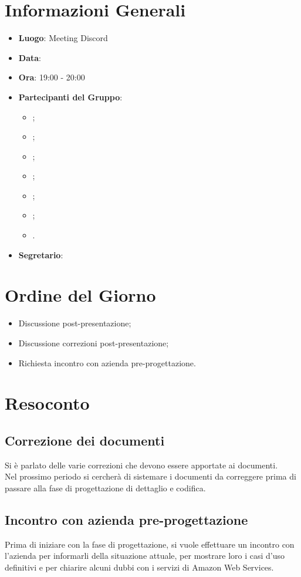 \section{Informazioni Generali}

\begin{itemize}
\item{\textbf{Luogo}}: Meeting Discord
\item{\textbf{Data}}: \D
\item{\textbf{Ora}}: 19:00 - 20:00
\item{\textbf{Partecipanti del Gruppo}}: 
	\begin{itemize}
	\item{\EP{};} 
	\item{\FP{};}
	\item{\GC{};}
	\item{\LW{};}
	\item{\MB{};}
	\item{\MG{};}
	\item{\PV{}.}
	\end{itemize} 
\item{\textbf{Segretario}}: \PV{}	
\end{itemize}

\section{Ordine del Giorno}
\begin{itemize}
\item{Discussione post-presentazione;}
\item{Discussione correzioni post-presentazione;}
\item{Richiesta incontro con azienda pre-progettazione.}
\end{itemize}

\section{Resoconto}
 
\subsection{Correzione dei documenti} 
Si è parlato delle varie correzioni che devono essere apportate ai documenti. \\ Nel prossimo periodo si cercherà di sistemare i documenti da correggere prima di passare alla fase di progettazione di dettaglio e codifica.
 
\subsection{Incontro con azienda pre-progettazione}
Prima di iniziare con la fase di progettazione, si vuole effettuare un incontro con l'azienda per informarli della situazione attuale, per mostrare loro i casi d'uso definitivi e per chiarire alcuni dubbi con i servizi di Amazon Web Services.